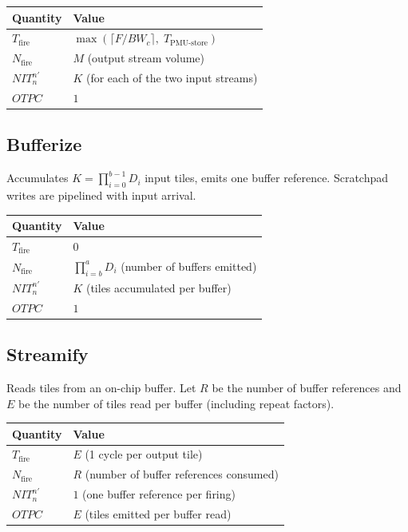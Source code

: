 \documentclass[10pt]{article}
\begin{document}
\begin{table}[h]
\centering
\begin{tabular}{@{}ll@{}}
\toprule
\textbf{Quantity} & \textbf{Value} \\
\midrule
$T_{\text{fire}}$ & $\max\!\left(\lceil F / \mathit{BW}_c\rceil,\; T_{\text{PMU-store}}\right)$ \\[4pt]
$N_{\text{fire}}$ & $M$ \quad (output stream volume) \\
$\mathit{NIT}^{n'}_n$ & $K$ \quad (for each of the two input streams) \\
$\mathit{OTPC}$ & $1$ \\
\bottomrule
\end{tabular}
\end{table}

\subsection{Bufferize}

Accumulates $K = \prod_{i=0}^{b-1} D_i$ input tiles, emits one buffer reference. Scratchpad writes are pipelined with input arrival.

\begin{table}[h]
\centering
\begin{tabular}{@{}ll@{}}
\toprule
\textbf{Quantity} & \textbf{Value} \\
\midrule
$T_{\text{fire}}$ & $0$ \\
$N_{\text{fire}}$ & $\prod_{i=b}^{a} D_i$ \quad (number of buffers emitted) \\
$\mathit{NIT}^{n'}_n$ & $K$ \quad (tiles accumulated per buffer) \\
$\mathit{OTPC}$ & $1$ \\
\bottomrule
\end{tabular}
\end{table}

\subsection{Streamify}

Reads tiles from an on-chip buffer. Let $R$ be the number of buffer references and $E$ be the number of tiles read per buffer (including repeat factors).

\begin{table}[h]
\centering
\begin{tabular}{@{}ll@{}}
\toprule
\textbf{Quantity} & \textbf{Value} \\
\midrule
$T_{\text{fire}}$ & $E$ \quad (1 cycle per output tile) \\
$N_{\text{fire}}$ & $R$ \quad (number of buffer references consumed) \\
$\mathit{NIT}^{n'}_n$ & $1$ \quad (one buffer reference per firing) \\
$\mathit{OTPC}$ & $E$ \quad (tiles emitted per buffer read) \\
\bottomrule
\end{tabular}
\end{table}
\end{document}
